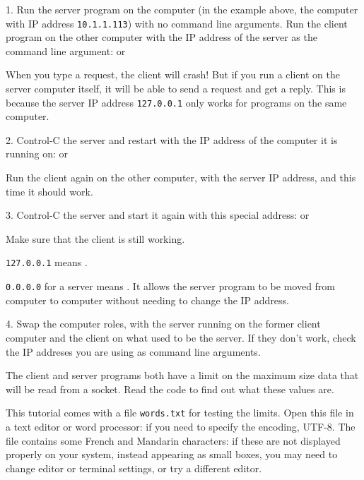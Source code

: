 1. Run the server program on the  computer (in the example above, the computer
with IP address \texttt{10.1.1.113}) with no command line arguments.
Run the client program on the other  computer with the IP address of the server
as the command line argument:
or

When you type a request, the client will crash! But if you run a client on the server computer
itself, it will be able to send a request and get a reply. This is because the server IP address
\texttt{127.0.0.1} only works for programs on the same computer.

2. Control-C the server and restart with the IP address of the computer it is running on:
or

Run the client again on the other computer, with the server IP address, and this time
it should work.

3. Control-C the server and start it again with this special address:
or

Make sure that the client is still working.

\begin{IMPORTANT}
\texttt{127.0.0.1} means .

\texttt{0.0.0.0} for a server means . It allows
the server program to be moved from computer to computer without needing to change the
IP address.
\end{IMPORTANT}

4. Swap the computer roles, with the server running on the former client computer and
the client on what used to be the server. If they don't work, check the IP addreses
you are using as command line arguments.



The client and server programs both have a limit on the maximum size data that
will be read from a socket. Read the code to find out what these values are.

This tutorial comes with a file \texttt{words.txt} for testing the limits. Open this
file in a text editor or word processor: if you need to specify the encoding, UTF-8.
The file contains some French and Mandarin characters: if these are not displayed
properly on your system, instead appearing as small boxes, you may need to change
editor or terminal settings, or try a different editor.

